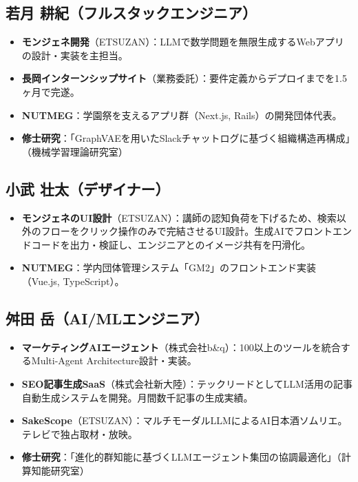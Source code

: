 \documentclass[paper=a4,fontsize=10.5bp,jafontsize=10.5bp]{jlreq}
\begin{document}
\subsection*{若月 耕紀（フルスタックエンジニア）}

\begin{itemize}
  \item \textbf{モンジェネ開発}（ETSUZAN）：LLMで数学問題を無限生成するWebアプリの設計・実装を主担当。
  \item \textbf{長岡インターンシップサイト}（業務委託）：要件定義からデプロイまでを1.5ヶ月で完遂。
  \item \textbf{NUTMEG}：学園祭を支えるアプリ群（Next.js, Rails）の開発団体代表。
  \item \textbf{修士研究}：「GraphVAEを用いたSlackチャットログに基づく組織構造再構成」（機械学習理論研究室）
\end{itemize}

\subsection*{小武 壮太（デザイナー）}

\begin{itemize}
  \item \textbf{モンジェネのUI設計}（ETSUZAN）：講師の認知負荷を下げるため、検索以外のフローをクリック操作のみで完結させるUI設計。生成AIでフロントエンドコードを出力・検証し、エンジニアとのイメージ共有を円滑化。
  \item \textbf{NUTMEG}：学内団体管理システム「GM2」のフロントエンド実装（Vue.js, TypeScript）。
\end{itemize}

\subsection*{舛田 岳（AI/MLエンジニア）}

\begin{itemize}
  \item \textbf{マーケティングAIエージェント}（株式会社b\&q）：100以上のツールを統合するMulti-Agent Architecture設計・実装。
  \item \textbf{SEO記事生成SaaS}（株式会社新大陸）：テックリードとしてLLM活用の記事自動生成システムを開発。月間数千記事の生成実績。
  \item \textbf{SakeScope}（ETSUZAN）：マルチモーダルLLMによるAI日本酒ソムリエ。テレビで独占取材・放映。
  \item \textbf{修士研究}：「進化的群知能に基づくLLMエージェント集団の協調最適化」（計算知能研究室）
\end{itemize}
\end{document}
